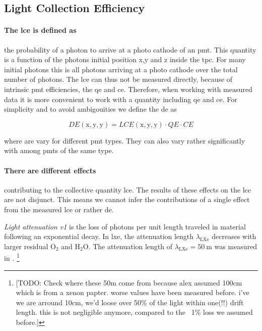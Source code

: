 
\FloatBarrier
\subsection{Light Collection Efficiency}
\label{ssec:lce}
\FloatBarrier



\paragraph{The \gls{lce} is defined as} the probability of a photon to arrive at a photo cathode of an \gls{pmt}.
This quantity is a function of the photons initial position x,y and z inside the \gls{tpc}.
For many initial photons this is all photons arriving at a photo cathode over the total number of photons.
The \gls{lce} can thus not be measured directly, because of intrinsic \gls{pmt} efficiencies, the \gls{qe} and \gls{ce}.
Therefore, when working with measured data it is more convenient to work with a quantity including \gls{qe} and \gls{ce}.
For simplicity and to avoid ambigouities we define the \gls{de} as


\begin{equation}
    DE\left(\mathrm{x}, \mathrm{y}, \mathrm{y}\right) =  LCE\left(\mathrm{x}, \mathrm{y}, \mathrm{y}\right) \cdot QE \cdot CE
\end{equation}

where are vary for different \gls{pmt} types.
They can also vary rather significantly with among \gls{pmt}s of the same type.

\paragraph{There are different effects} contributing to the collective quantity \gls{lce}.
The results of these effects on the \gls{lce} are not disjunct.
This means we cannot infer the contributions of a single effect from the measured \gls{lce} or rather \gls{de}.

\emph{Light attenuation v1} is the loss of photons per unit length traveled in material following an exponential decay.
In \gls{lxe}, the attenuation length $ \lambda_\mathrm{LXe} $ decreases with larger residual $ \mathrm{O}_2 $ and $ \mathrm{H}_2\mathrm{O} $.
The attenuation length of $ \lambda_\mathrm{LXe} = \SI{50}{\m} $ was measured in \oneton\cite{}.  %
\footnote{[TODO: Check where these 50m come from because alex assumed 100cm which is from a xenon papter. worse values have been measured before. i've we are arround 10cm, we'd loose over 50\% of the light within one(!!) drift length. this is not negligible anymore, compared to the ~1\% loss we assumed before.]}

